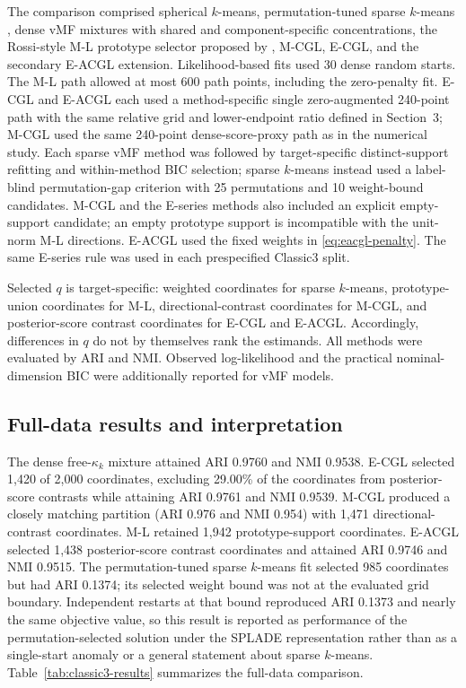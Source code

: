 \documentclass[preprint,12pt,authoryear]{elsarticle}
\begin{document}
The comparison comprised spherical $k$-means, permutation-tuned sparse
$k$-means \citep{witten2010sparseclustering}, dense vMF mixtures with shared
and component-specific concentrations, the Rossi-style M-L prototype selector
proposed by \citet{rossi2022sparsevmf}, M-CGL, E-CGL, and the secondary E-ACGL
extension.
Likelihood-based fits used
30 dense random starts.
The M-L path allowed at most 600 path points, including the zero-penalty fit.
E-CGL and E-ACGL each used a method-specific single zero-augmented 240-point
path with the same relative grid and lower-endpoint ratio defined in Section~3;
M-CGL used the same 240-point dense-score-proxy path as in the numerical study.
Each sparse vMF method was followed by target-specific distinct-support
refitting and within-method BIC selection; sparse $k$-means instead used a
label-blind permutation-gap criterion with 25 permutations and 10 weight-bound
candidates. M-CGL and the E-series methods also
included an explicit empty-support candidate; an empty prototype support is
incompatible with the unit-norm M-L directions. E-ACGL used the fixed weights
in \eqref{eq:eacgl-penalty}.
The same E-series rule was used in each prespecified Classic3 split.

Selected $q$ is target-specific: weighted coordinates for sparse $k$-means,
prototype-union coordinates for M-L, directional-contrast coordinates for
M-CGL, and posterior-score contrast coordinates for E-CGL and E-ACGL.
Accordingly, differences in $q$ do not by themselves rank the estimands.
All methods were evaluated by ARI and NMI. Observed log-likelihood and the
practical nominal-dimension BIC were additionally reported for vMF models.

\subsection{Full-data results and interpretation}

The dense free-$\kappa_k$ mixture attained ARI 0.9760 and NMI 0.9538. E-CGL
selected 1,420 of 2,000 coordinates, excluding 29.00\% of the coordinates from
posterior-score contrasts while attaining ARI 0.9761 and NMI 0.9539.
M-CGL produced a closely matching partition (ARI 0.976 and NMI 0.954) with
1,471 directional-contrast coordinates.
M-L retained 1,942 prototype-support coordinates. E-ACGL selected 1,438
posterior-score contrast coordinates and attained ARI 0.9746 and NMI 0.9515.
The permutation-tuned sparse $k$-means fit selected 985 coordinates but had
ARI 0.1374; its selected weight bound was not at the evaluated grid boundary.
Independent restarts at that bound reproduced ARI 0.1373 and nearly the same
objective value, so this result is reported as performance of the
permutation-selected solution under the SPLADE representation rather than as
a single-start anomaly or a general statement about sparse $k$-means.
Table~\ref{tab:classic3-results} summarizes the full-data comparison.
\end{document}
